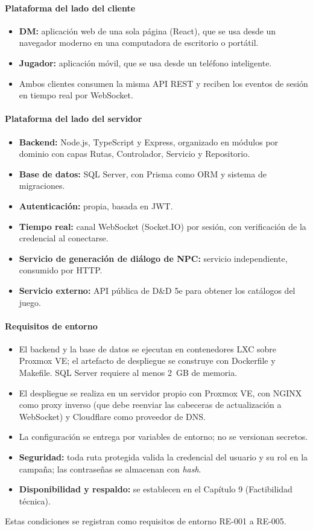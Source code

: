 \paragraph{Plataforma del lado del cliente}
\begin{itemize}
  \item \textbf{DM:} aplicación web de una sola página (React), que se usa desde un navegador moderno en una computadora de escritorio o portátil.
  \item \textbf{Jugador:} aplicación móvil, que se usa desde un teléfono inteligente.
  \item Ambos clientes consumen la misma API REST y reciben los eventos de sesión en tiempo real por WebSocket.
\end{itemize}

\paragraph{Plataforma del lado del servidor}
\begin{itemize}
  \item \textbf{Backend:} Node.js, TypeScript y Express, organizado en módulos por dominio con capas Rutas, Controlador, Servicio y Repositorio.
  \item \textbf{Base de datos:} SQL Server, con Prisma como ORM y sistema de migraciones.
  \item \textbf{Autenticación:} propia, basada en JWT.
  \item \textbf{Tiempo real:} canal WebSocket (Socket.IO) por sesión, con verificación de la credencial al conectarse.
  \item \textbf{Servicio de generación de diálogo de NPC:} servicio independiente, consumido por HTTP.
  \item \textbf{Servicio externo:} API pública de D\&D 5e para obtener los catálogos del juego.
\end{itemize}

\paragraph{Requisitos de entorno}
\begin{itemize}
  \item El backend y la base de datos se ejecutan en contenedores LXC sobre Proxmox VE; el artefacto de despliegue se construye con Dockerfile y Makefile. SQL Server requiere al menos 2~GB de memoria.
  \item El despliegue se realiza en un servidor propio con Proxmox VE, con NGINX como proxy inverso (que debe reenviar las cabeceras de actualización a WebSocket) y Cloudflare como proveedor de DNS.
  \item La configuración se entrega por variables de entorno; no se versionan secretos.
  \item \textbf{Seguridad:} toda ruta protegida valida la credencial del usuario y su rol en la campaña; las contraseñas se almacenan con \textit{hash}.
  \item \textbf{Disponibilidad y respaldo:} se establecen en el Capítulo 9 (Factibilidad técnica).
\end{itemize}
Estas condiciones se registran como requisitos de entorno RE-001 a RE-005.

